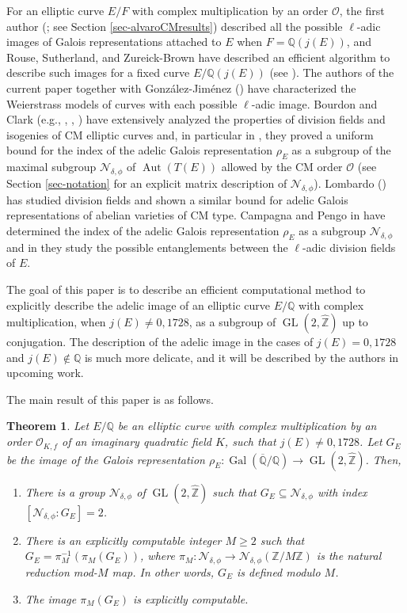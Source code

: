 \documentclass[11pt]{amsart}
\newtheorem{thm}[defn]{Theorem}
\theoremstyle{definition}
\newcommand{\Q}{\mathbb{Q}}
\newcommand{\Z}{\mathbb{Z}}
\newcommand{\Of}{\mathcal{O}_{K,f}}
\newcommand{\OO}{\mathcal{O}}
\newcommand{\Rats}{\mathbb{Q}}
\newcommand{\Gal}{\operatorname{Gal}}
\newcommand{\Aut}{\operatorname{Aut}}
\newcommand{\GQ}{\Gal(\overline{\Rats}/\Rats)}
\newcommand{\GL}{\operatorname{GL}}
\begin{document}
For an elliptic curve $E/F$ with complex multiplication by an order $\OO$, the first author (\cite{lozano-galoiscm}; see Section \ref{sec-alvaroCMresults}) described all the possible $\ell$-adic images of Galois representations attached to $E$ when $F=\Q(j(E))$, and  Rouse, Sutherland, and Zureick-Brown have described an efficient algorithm to describe such images for a fixed curve $E/\Q(j(E))$ (see \cite[Section 12]{elladic}). The authors of the current paper together with Gonz\'alez-Jim\'enez (\cite{modelspaper}) have characterized the Weierstrass models of curves with each possible $\ell$-adic image. Bourdon and Clark (e.g., \cite{bourdon2},
\cite{bourdon}, \cite{bourdon4}) have extensively analyzed the properties of division fields and isogenies of CM elliptic curves and, in particular in  \cite[Cor. 1.5]{bourdon2}, they proved a uniform bound for the  index of the adelic Galois representation $\rho_E$ as a subgroup of the maximal subgroup $\mathcal{N}_{\delta,\phi}$ of $\Aut(T(E))$ allowed by the CM order $\OO$ (see Section \ref{sec-notation} for an explicit matrix description of $\mathcal{N}_{\delta,\phi}$). Lombardo (\cite{lombardo}) has studied division fields and shown a similar bound for adelic Galois representations of abelian varieties of CM type. Campagna and Pengo in \cite{CampagnaPengo2}  have determined the index of the adelic Galois representation $\rho_E$ as a subgroup  $\mathcal{N}_{\delta,\phi}$   and in \cite{CampagnaPengo1}  they study the possible entanglements between the $\ell$-adic division fields of $E$. 

The goal of this paper is to describe an efficient computational method to explicitly describe the adelic image of an elliptic curve $E/\Q$ with complex multiplication, when $j(E)\neq 0,1728$, as a subgroup of $\GL(2,\widehat{\Z})$ up to conjugation. The description of the adelic image in the cases of $j(E)=0,1728$ and $j(E)\not\in\Q$ is much more delicate, and it will be described by the authors in upcoming work. 

The main result of this paper is as follows.


\begin{thm}\label{main-result}
    Let $E/\Q$ be an elliptic curve with complex multiplication by an order $\Of$ of an imaginary quadratic field $K$, such that $j(E)\neq 0,1728$. Let $G_E$ be the image of the Galois representation $\rho_E\colon \GQ\to \GL(2,\widehat{\Z})$. Then,
    \begin{enumerate}
        \item There is a group $\mathcal{N}_{\delta,\phi}$ of $\GL(2,\widehat{\Z})$ such that $G_E\subseteq\mathcal{N}_{\delta,\phi}$ with index $[\mathcal{N}_{\delta,\phi}:G_E]=2$. 
        \item There is an explicitly computable integer $M\geq 2$ such that $G_E=\pi_M^{-1}(\pi_M(G_E))$, where $\pi_M\colon \mathcal{N}_{\delta,\phi}\to \mathcal{N}_{\delta,\phi}(\Z/M\Z)$ is the natural reduction mod-$M$ map. In other words, $G_E$ is defined modulo $M$.
        \item The image $\pi_M(G_E)$ is explicitly computable.
    \end{enumerate}
\end{thm}
\end{document}
